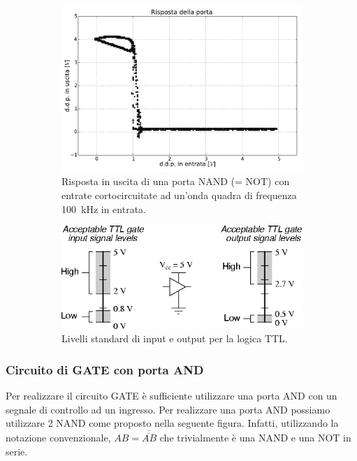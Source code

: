 \begin{figure}[htpc]
\centering
	\begin{subfigure}[hc]{0.49\textwidth}
		\centering
		\includegraphics[width=.95\textwidth]{../E09/latex/XY.pdf}
                \caption{Risposta in uscita di una porta NAND (= NOT) con entrate cortocircuitate ad un'onda quadra di frequenza \SI{100}{\kHz} in entrata.}
                \label{fig9:XY}
        \end{subfigure}%
	\quad
        \begin{subfigure}[hc]{0.49\textwidth}
		\centering
		\includegraphics[width=.95\textwidth]{../E09/latex/TTL.png}
                \caption{Livelli standard di input e output per la logica TTL.}
                \label{fig9:TTL}
        \end{subfigure}
\caption{}
\end{figure}
\vspace{-5mm}

\subsubsection{Circuito di GATE con porta AND}
Per realizzare il circuito GATE è sufficiente utilizzare una porta AND con un segnale di controllo ad un ingresso.
Per realizzare una porta AND possiamo utilizzare 2 NAND come proposto nella seguente figura.
Infatti, utilizzando la notazione convenzionale, $AB=\overline {\overline {AB}}$ che trivialmente è una NAND e una NOT in serie.
 
